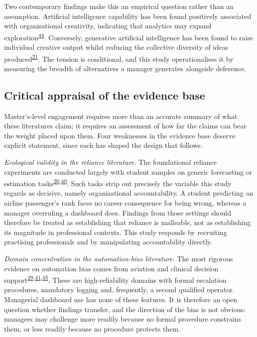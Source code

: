 \documentclass[11pt,a4paper]{article}
\numberwithin{figure}{section}
\numberwithin{table}{section}
\begin{document}
Two contemporary findings make this an empirical question rather than an assumption. Artificial
intelligence capability has been found positively associated with organisational creativity, indicating
that analytics may expand exploration\textsuperscript{\hyperlink{ref44}{44}}. Conversely, generative artificial intelligence has
been found to raise individual creative output whilst reducing the collective diversity of ideas
produced\textsuperscript{\hyperlink{ref21}{21}}. The tension is conditional, and this study operationalises it by measuring the
breadth of alternatives a manager generates alongside deference.

\subsection{Critical appraisal of the evidence base}

Master's-level engagement requires more than an accurate summary of what these literatures claim; it
requires an assessment of how far the claims can bear the weight placed upon them. Four weaknesses in the
evidence base deserve explicit statement, since each has shaped the design that follows.

\emph{Ecological validity in the reliance literature.} The foundational reliance experiments are conducted
largely with student samples on generic forecasting or estimation tasks\textsuperscript{\hyperlink{ref20}{20},\hyperlink{ref40}{40}}. Such
tasks strip out precisely the variable this study regards as decisive, namely organisational
accountability. A student predicting an airline passenger's rank faces no career consequence for being
wrong, whereas a manager overruling a dashboard does. Findings from those settings should therefore be
treated as establishing that reliance is malleable, not as establishing its magnitude in professional
contexts. This study responds by recruiting practising professionals and by manipulating accountability
directly.

\emph{Domain concentration in the automation-bias literature.} The most rigorous evidence on automation
bias comes from aviation and clinical decision support\textsuperscript{\hyperlink{ref29}{29},\hyperlink{ref41}{41},\hyperlink{ref45}{45}}. These are
high-reliability domains with formal escalation procedures, mandatory logging and, frequently, a second
qualified operator. Managerial dashboard use has none of these features. It is therefore an open question
whether findings transfer, and the direction of the bias is not obvious: managers may challenge more
readily because no formal procedure constrains them, or less readily because no procedure protects them.
\end{document}
